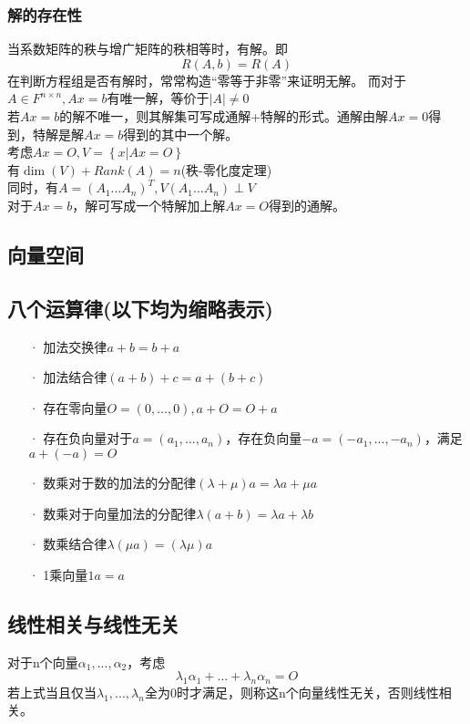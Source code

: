 \documentclass[UTF8]{ctexart}
\begin{document}
\subsubsection{解的存在性}
当系数矩阵的秩与增广矩阵的秩相等时，有解。即
\[\displaystyle R(A,b)=R(A) \]
在判断方程组是否有解时，常常构造“零等于非零”来证明无解。
\indent
而对于$A\in F^{n\times n},Ax=b$有唯一解，等价于$|A|\neq 0$\\
\indent
若$Ax=b$的解不唯一，则其解集可写成通解+特解的形式。通解由解$Ax=\mathit{0}$得到，特解是解$Ax=b$得到的其中一个解。\\
\indent
考虑$Ax=\mathit{O},V=\left\{{x|Ax=\mathit{O}}\right\}$\\
\indent
有$\dim(V)+Rank(A)=n$(秩-零化度定理)\\
\indent
同时，有$A=(A_1...A_n)^T,V(A_1...A_n)\perp V$\\
\indent
对于$Ax=b$，解可写成一个特解加上解$Ax=\mathit{O}$得到的通解。
\subsection{向量空间}
\subsection{八个运算律(以下均为缩略表示)}
\begin{itemize}
	\item [·]加法交换律$a+b=b+a$
	\item [·]加法结合律$(a+b)+c=a+(b+c)$
	\item [·]存在零向量$\mathit{O}=(0,...,0),a+\mathit{O}=\mathit{O}+a$
	\item [·]存在负向量对于$a=(a_1,...,a_n)$，存在负向量$-a=(-a_1,...,-a_n)$，满足$a+(-a)=\mathit{O}$
	\item [·]数乘对于数的加法的分配律$(\lambda+\mu)a=\lambda a+\mu a$
	\item [·]数乘对于向量加法的分配律$\lambda(a+b)=\lambda a+\lambda b$
	\item [·]数乘结合律$\lambda(\mu a)=(\lambda \mu)a$
	\item [·]1乘向量$1a=a$
\end{itemize}
\subsection{线性相关与线性无关}
对于n个向量$\alpha_1,...,\alpha_2$，考虑
\[\displaystyle \lambda_1\alpha_1+...+\lambda_n\alpha_n=\mathit{O}\]
\indent
若上式当且仅当$\lambda_1,...,\lambda_n$全为0时才满足，则称这n个向量线性无关，否则线性相关。
\end{document}
